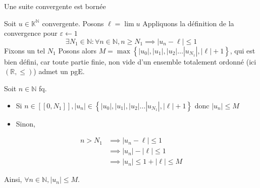 \documentclass{article}
\begin{document}
	\begin{question_kholle}{Une suite convergente est bornée}

        Soit $u \in \mathbb{K}^{\mathbb{N}}$ convergente.
Posons $\ell = \lim u$
Appliquons la définition de la convergence pour $\varepsilon \leftarrow 1$
$$
\exists N_{1}\in \mathbb{N}: \forall n \in \mathbb{N}, n \geqslant N_{1} \implies |u_{n}-\ell| \leqslant 1
$$
Fixons un tel $N_{1}$
Posons alors $M = \max\left\{ |u_{0}|, |u_{1}|, |u_{2}| \dots |u_{N_{1}}|, |\ell|+1 \right\}$, qui est bien défini, car toute partie finie, non vide d'un ensemble totalement ordonné (ici $(\mathbb{R}, \leqslant)$) admet un pgE.

Soit $n \in \mathbb{N}$ fq.
\begin{itemize}
    \item Si $n \in [[0, N_{1}]], |u_{n}| \in \left\{ |u_{0}|, |u_{1}|, |u_{2}| \dots |u_{N_{1}}|, |\ell|+1 \right\}$ donc $|u_{n}| \leqslant M$
	\item Sinon,
\end{itemize}

\begin{align*}
n> N_{1} &\implies |u_{n} - \ell| \leqslant 1 \\
&\implies |u_{n}| - |\ell| \leqslant 1 \\
 & \implies |u_{n}| \leqslant 1+ |\ell| \leqslant M
\end{align*}

Ainsi, $\forall n \in \mathbb{N}, |u_{n}| \leqslant M$.
    \end{question_kholle}
\end{document}
